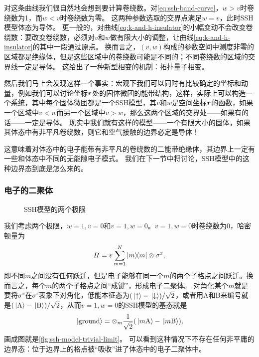 对这条曲线我们很自然地会想到要计算卷绕数。对\eqref{eq:ssh-band-curve}，$w > v$时卷绕数为1，而$w < v$时卷绕数为零。
这两种参数选取的交界点满足$w = v$，此时SSH模型体态为导体。
更一般的，对曲线\eqref{eq:k-and-h-insulator}的小幅变动不会改变卷绕数：要改变卷绕数，必须对$v$和$w$做有限大小的调整，让曲线\eqref{eq:k-and-h-insulator}的其中一段通过原点。
换而言之，$(v, w)$构成的参数空间中测度非零的区域都是绝缘体，但是这些区域中的卷绕数可能是不同的；不同卷绕数的区域的交界线一定是导体。
这给出了一种新型相变的机制：拓扑量子相变。

然后我们马上会发现这样一个事实：宏观下我们可以同时有比较确定的坐标和动量，例如我们可以讨论坐标$\vb*{r}$处的固体微团的能带结构，这样，实际上可以构造一个系统，其中每个固体微团都是一个SSH模型，其$v$和$w$是空间坐标$\vb*{r}$的函数，如果一个区域中$v < w$而另一个区域中$v > w$，那么这两个区域的交界处——如果有的话——一定是导体。
现实中我们就有这样的模型——一个有限大小的固体，如果其体态中有非平凡卷绕数，则它和空气接触的边界必定是导体！

这意味着对体态中的电子能带有非平凡的卷绕数的二能带绝缘体，其边界上一定有一些和体态中不同的无能隙电子模式。
我们在下一节中将讨论，SSH模型中的这种边界态到底是怎么来的。

\subsubsection{电子的二聚体}

\begin{figure}
    \centering
    \subfigure[$v=1, w= 0$，没有边界态]{
         
        \label{fig:ssh-model-trivial-limit}  
    }
    \subfigure[$w = 1, v = 0$，有边界态]{
        
        \label{fig:ssh-model-topological-limit}
    }
    \caption{SSH模型的两个极限}
\end{figure}

我们考虑两个极限，$w = 1, v = 0$和$v = 1, w = 0$。$v = 1, w = 0$时卷绕数为0，哈密顿量为
\begin{equation}
    H = v \sum_{m=1}^N \dyad{m} \otimes \sigma^x ,
\end{equation}
即不同$m$之间没有任何跃迁，但是电子能够在同一个$m$的两个子格点之间跃迁。换而言之，每个$m$的两个子格点之间“成键”，形成电子二聚体。
对角化某个$m$就是要将$\sigma^x$在$\sigma^z$表象下对角化，低能本征态为$(\ket*{\uparrow} - \ket*{\downarrow}) / \sqrt{2}$，或者用A和B来编号就是$(\ket*{\text{A}} - \ket*{\text{B}}) / \sqrt{2}$，从而$v = 1, w = 0$的SSH模型的基态就是
\begin{equation}
    \ket*{\text{ground}} = \otimes_{m} \frac{1}{\sqrt{2}} (\ket*{m \text{A}} - \ket*{m \text{B}}),
\end{equation}
画成图就是\autoref{fig:ssh-model-trivial-limit}。
可以看到这种情况下不存在任何非平庸的边界态：位于边界上的格点被“吸收”进了体态中的电子二聚体中。

